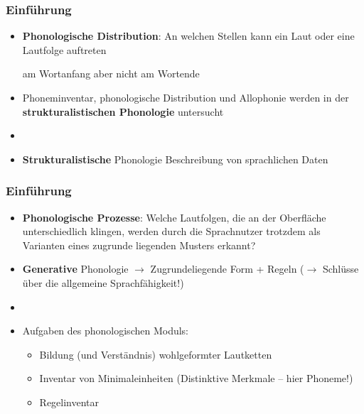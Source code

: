 
\begin{frame}
\frametitle{Einführung}

\begin{itemize}
	\item \textbf{Phonologische Distribution}: An welchen Stellen kann ein Laut oder eine Lautfolge auftreten

	\ea \textipa{[St\textscr]} am Wortanfang aber nicht am Wortende \textipa{[St{\textscr}\t{aU}x]} \vs *
	\z

	\item Phoneminventar, phonologische Distribution und Allophonie werden in der \textbf{strukturalistischen Phonologie} untersucht
	\item[]
	\item \textbf{Strukturalistische} Phonologie \ras Beschreibung von sprachlichen Daten 

\end{itemize}

\end{frame}



\begin{frame}
\frametitle{Einführung}

\begin{itemize}
	\item \textbf{Phonologische Prozesse}: Welche Lautfolgen, die an der Oberfläche unterschiedlich klingen, werden durch die Sprachnutzer trotzdem als Varianten eines zugrunde liegenden Musters erkannt?

\ea \textipa{[ga{\textscr}t@n]} \vs 
\textipa{[ga:d\textsyllabic{n}]}
\z

	\item \textbf{Generative} Phonologie $\rightarrow$ Zugrundeliegende Form +  Regeln ($\rightarrow$ Schlüsse über die allgemeine Sprachfähigkeit!) 
	\item[]
	\item Aufgaben des phonologischen Moduls:
	
	\begin{itemize}
		\item Bildung (und Verständnis) wohlgeformter Lautketten
		\item Inventar von Minimaleinheiten (Distinktive Merkmale -- hier Phoneme!)
		\item Regelinventar
	\end{itemize}
	 
\end{itemize}

\end{frame}



